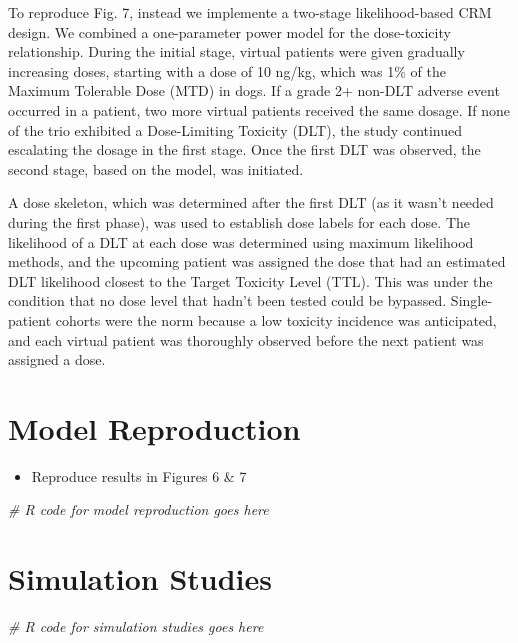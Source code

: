 \documentclass[
]{article}
\newenvironment{Shaded}{\begin{snugshade}}{\end{snugshade}}
\newcommand{\CommentTok}[1]{\textcolor[rgb]{0.56,0.35,0.01}{\textit{#1}}}
\providecommand{\tightlist}{%
  \setlength{\itemsep}{0pt}\setlength{\parskip}{0pt}}
\begin{document}
To reproduce Fig. 7, instead we implemente a two-stage likelihood-based
CRM design. We combined a one-parameter power model for the
dose-toxicity relationship. During the initial stage, virtual patients
were given gradually increasing doses, starting with a dose of 10 ng/kg,
which was 1\% of the Maximum Tolerable Dose (MTD) in dogs. If a grade 2+
non-DLT adverse event occurred in a patient, two more virtual patients
received the same dosage. If none of the trio exhibited a Dose-Limiting
Toxicity (DLT), the study continued escalating the dosage in the first
stage. Once the first DLT was observed, the second stage, based on the
model, was initiated.

A dose skeleton, which was determined after the first DLT (as it wasn't
needed during the first phase), was used to establish dose labels for
each dose. The likelihood of a DLT at each dose was determined using
maximum likelihood methods, and the upcoming patient was assigned the
dose that had an estimated DLT likelihood closest to the Target Toxicity
Level (TTL). This was under the condition that no dose level that hadn't
been tested could be bypassed. Single-patient cohorts were the norm
because a low toxicity incidence was anticipated, and each virtual
patient was thoroughly observed before the next patient was assigned a
dose.

\hypertarget{model-reproduction}{%
\section{Model Reproduction}\label{model-reproduction}}

\begin{itemize}
\tightlist
\item
  Reproduce results in Figures 6 \& 7
\end{itemize}

\begin{Shaded}
\begin{Highlighting}[]
\CommentTok{\# R code for model reproduction goes here}
\end{Highlighting}
\end{Shaded}

\hypertarget{simulation-studies}{%
\section{Simulation Studies}\label{simulation-studies}}

\begin{Shaded}
\begin{Highlighting}[]
\CommentTok{\# R code for simulation studies goes here}
\end{Highlighting}
\end{Shaded}
\end{document}
